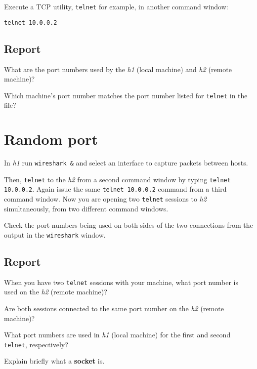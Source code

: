 \documentclass{../UTNetLab}
\begin{document}
    Execute a TCP utility, \lstinline{telnet} for example, in another command window:
    \begin{lstlisting}
telnet 10.0.0.2
    \end{lstlisting}
    
    \subsection*{Report}
    What are the port numbers used by the \textit{h1} (local machine) and \textit{h2} (remote machine)?

    Which machine’s port number matches the port number listed for \lstinline{telnet} in the  file?

\section{Random port}
    In \textit{h1} run \lstinline{wireshark &} and select an interface to capture packets between hosts.

    Then, \lstinline{telnet} to the \textit{h2} from a second command window by typing \lstinline{telnet 10.0.0.2}.
    Again issue the same \lstinline{telnet 10.0.0.2} command from a third command window.
    Now you are opening two \lstinline{telnet} sessions to \textit{h2} simultaneously, from two different command windows.

    Check the port numbers being used on both sides of the two connections from the output in the \lstinline{wireshark} window.

    \subsection*{Report}
    When you have two \lstinline{telnet} sessions with your machine, what port number is used on the \textit{h2} (remote machine)?

    Are both sessions connected to the same port number on the \textit{h2} (remote machine)?

    What port numbers are used in \textit{h1} (local machine) for the first and second \lstinline{telnet}, respectively?

    Explain briefly what a \textbf{socket} is.
\end{document}
